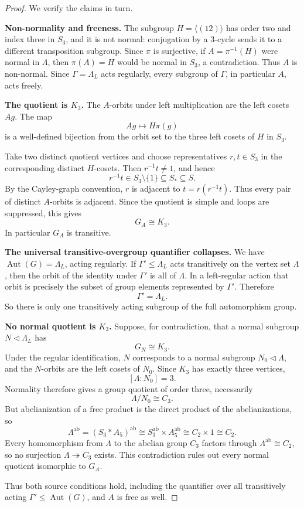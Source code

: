 \documentclass[11pt]{article}
\newcommand{\Aut}{\operatorname{Aut}}
\begin{document}
\begin{proof}
We verify the claims in turn.

\medskip\noindent
\textbf{Non-normality and freeness.}
The subgroup $H=\langle(12)\rangle$ has order two and index three in $S_3$, and it is not normal: conjugation by a 3-cycle sends it to a different transposition subgroup.  Since $\pi$ is surjective, if $A=\pi^{-1}(H)$ were normal in $\Lambda$, then $\pi(A)=H$ would be normal in $S_3$, a contradiction.  Thus $A$ is non-normal.  Since $\Gamma=\Lambda_L$ acts regularly, every subgroup of $\Gamma$, in particular $A$, acts freely.

\medskip\noindent
\textbf{The quotient is $K_3$.}
The $A$-orbits under left multiplication are the left cosets $Ag$.  The map
\[
Ag\longmapsto H\pi(g)
\]
is a well-defined bijection from the orbit set to the three left cosets of $H$ in $S_3$.

Take two distinct quotient vertices and choose representatives $r,t\in S_3$ in the corresponding distinct $H$-cosets.  Then $r^{-1}t\neq1$, and hence
\[
r^{-1}t\in S_3\setminus\{1\}\subseteq S_*\subseteq S.
\]
By the Cayley-graph convention, $r$ is adjacent to $t=r(r^{-1}t)$.  Thus every pair of distinct $A$-orbits is adjacent.  Since the quotient is simple and loops are suppressed, this gives
\[
G_A\cong K_3.
\]
In particular $G_A$ is transitive.

\medskip\noindent
\textbf{The universal transitive-overgroup quantifier collapses.}
We have $\Aut(G)=\Lambda_L$, acting regularly.  If $\Gamma'\leq\Lambda_L$ acts transitively on the vertex set $\Lambda$, then the orbit of the identity under $\Gamma'$ is all of $\Lambda$.  In a left-regular action that orbit is precisely the subset of group elements represented by $\Gamma'$.  Therefore
\[
\Gamma'=\Lambda_L.
\]
So there is only one transitively acting subgroup of the full automorphism group.

\medskip\noindent
\textbf{No normal quotient is $K_3$.}
Suppose, for contradiction, that a normal subgroup $N\triangleleft\Lambda_L$ has
\[
G_N\cong K_3.
\]
Under the regular identification, $N$ corresponds to a normal subgroup $N_0\triangleleft\Lambda$, and the $N$-orbits are the left cosets of $N_0$.  Since $K_3$ has exactly three vertices,
\[
[\Lambda:N_0]=3.
\]
Normality therefore gives a group quotient of order three, necessarily
\[
\Lambda/N_0\cong C_3.
\]
But abelianization of a free product is the direct product of the abelianizations, so
\[
\Lambda^{\mathrm{ab}}
=(S_3*A_5)^{\mathrm{ab}}
\cong S_3^{\mathrm{ab}}\times A_5^{\mathrm{ab}}
\cong C_2\times 1
\cong C_2.
\]
Every homomorphism from $\Lambda$ to the abelian group $C_3$ factors through $\Lambda^{\mathrm{ab}}\cong C_2$, so no surjection $\Lambda\twoheadrightarrow C_3$ exists.  This contradiction rules out every normal quotient isomorphic to $G_A$.

Thus both source conditions hold, including the quantifier over all transitively acting $\Gamma'\leq\Aut(G)$, and $A$ is free as well.
\end{proof}
\end{document}
